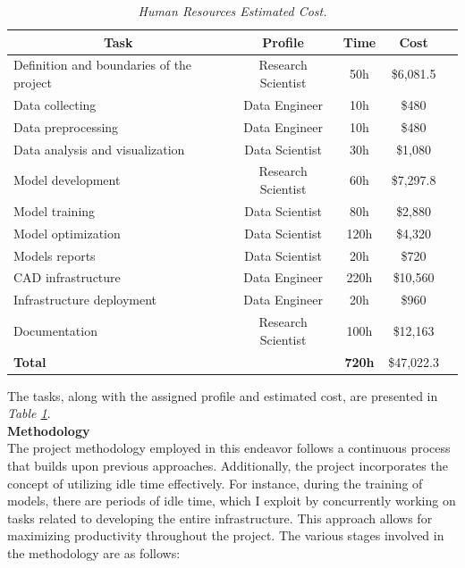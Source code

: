 \newpage

\begin{table}[H]
\centering
\begin{tabular}{| l | c | c | c | c |}
\hline
\multicolumn{1}{|c|}{\textbf{Task}} & \multicolumn{1}{c|}{\textbf{Profile}} & \multicolumn{1}{c|}{\textbf{Time}} & \multicolumn{1}{c|}{\textbf{Cost}} \\
\hline
Definition and boundaries of the project & Research Scientist & 50h & \$6,081.5\\
\hline
Data collecting & Data Engineer & 10h & \$480\\
\hline
Data preprocessing & Data Engineer & 10h & \$480 \\
\hline
Data analysis and visualization & Data Scientist & 30h & \$1,080\\
\hline
Model development & Research Scientist & 60h & \$7,297.8 \\
\hline
Model training & Data Scientist & 80h & \$2,880 \\
\hline
Model optimization & Data Scientist & 120h & \$4,320 \\
\hline
Models reports & Data Scientist & 20h & \$720 \\
\hline
CAD infrastructure & Data Engineer & 220h & \$10,560 \\
\hline
Infrastructure deployment & Data Engineer & 20h & \$960 \\
\hline
Documentation & Research Scientist & 100h & \$12,163 \\
\hline
\textbf{Total} &    &  \textbf{720h} & \$47,022.3 \\
\hline
\end{tabular}
\caption[Human Resources Estimated Cost.]{\textit{Human Resources Estimated Cost.}}
{\label{table:human_resources_cost}}
\end{table}

The tasks, along with the assigned profile and estimated cost, are presented in \textit{Table \ref{table:human_resources_cost}}. \\

\vspace{0.5cm}
\textbf{Methodology} \\

The project methodology employed in this endeavor follows a continuous process that builds upon previous approaches. Additionally, the project incorporates the concept of utilizing idle time effectively. For instance, during the training of models, there are periods of idle time, which I exploit by concurrently working on tasks related to developing the entire infrastructure. This approach allows for maximizing productivity throughout the project. The various stages involved in the methodology are as follows: \\

